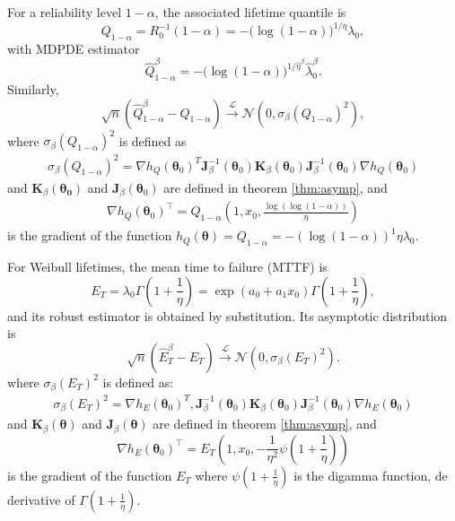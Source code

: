 \documentclass{article}
\begin{document}
For a reliability level $1-\alpha$, the associated lifetime quantile is
\begin{equation}
Q_{1-\alpha}=R_0^{-1}(1-\alpha)
=-\big(\log(1-\alpha)\big)^{1/\eta}\lambda_0,  \nonumber
\end{equation}
with MDPDE estimator
\begin{equation}
\widehat{Q}^{\beta}_{1-\alpha}
=-\big(\log(1-\alpha)\big)^{1/\widehat{\eta}^{\beta}}
\widehat{\lambda}^{\beta}_0.  \nonumber
\end{equation}
Similarly,
\begin{equation}
\sqrt{n}\left(\widehat{Q}^{\beta}_{1-\alpha}-Q_{1-\alpha}\right)
\overset{\mathscr{L}}{\longrightarrow}
\mathcal{N}\left(0,\sigma_{\beta}(Q_{1-\alpha})^2\right),  \nonumber
\end{equation}
where $\sigma_{\beta}(Q_{1-\alpha})^2$ is defined as
	\begin{align*}
	\sigma_{\beta}\left( Q_{1-\alpha}\right)^2=\nabla h_Q(\boldsymbol{\theta}_0)^{T} \boldsymbol{J}^{-1}_{\beta}(\boldsymbol{\theta}_0)\boldsymbol{K}_\beta(\boldsymbol{\theta}_0)\boldsymbol{J}^{-1}_\beta(\boldsymbol{\theta}_0)\nabla h_Q(\boldsymbol{\theta}_0)
	\end{align*}
	and $\boldsymbol{K}_\beta(\boldsymbol{\theta_0})$ and $\boldsymbol{J}_\beta(\boldsymbol{\theta}_0)$ are defined in theorem \ref{thm:asymp}, and 
	\begin{align*}
	\nabla h_Q(\boldsymbol{\theta}_0)^{\top}=Q_{1-\alpha}\left( 1, x_0,\frac{\log(\log(1-\alpha))}{\eta}\right)
	\end{align*}
	is the gradient of the function $h_Q(\boldsymbol{\theta}) = Q_{1-\alpha} =- \left(\log\left(1-\alpha\right)\right)^{1}{\eta}\lambda_0$.

For Weibull lifetimes, the mean time to failure (MTTF) is
\begin{equation}
E_T=\lambda_0\Gamma\left(1+\frac{1}{\eta}\right)
=\exp(a_0+a_1x_0)\Gamma\left(1+\frac{1}{\eta}\right),
\end{equation}
and its robust estimator is obtained by substitution. Its asymptotic distribution is
\begin{equation}
\sqrt{n}\left(\widehat{E}_T^{\beta}-E_T\right)
\overset{\mathscr{L}}{\longrightarrow}
\mathcal{N}\left(0,\sigma_{\beta}(E_T)^2\right).
\end{equation}
where $\sigma_{\beta}(E_T)^2$ is defined as:
\begin{align*}
\sigma_{\beta}\left( E_{T}\right)^2=\nabla h_E(\boldsymbol{\theta}_0)^{T}, \boldsymbol{J}^{-1}_\beta(\boldsymbol{\theta}_0)\boldsymbol{K}_\beta(\boldsymbol{\theta}_0)\boldsymbol{J}^{-1}_\beta(\boldsymbol{\theta}_0)\nabla h_E(\boldsymbol{\theta}_0)
\end{align*}
and $\boldsymbol{K}_\beta(\boldsymbol{\theta})$ and $\boldsymbol{J}_\beta(\boldsymbol{\theta})$ are defined in theorem \ref{thm:asymp}, and 
\begin{equation}
\nabla h_E(\boldsymbol{\theta}_0)^{\top}=E_{T}\left( 1, x_0,-\frac{1}{\eta^2}\psi\left(1+\frac{1}{\eta}\right)\right)
\end{equation}
is the gradient of the function $E_{T}$ where $\psi\left(1+\frac{1}{\eta}\right) $ is the digamma function, de derivative of $\Gamma\left(1+\frac{1}{\eta}\right)$.
\end{document}
